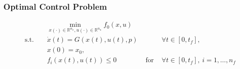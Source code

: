

\begin{frame}
\frametitle{Optimal Control Problem}
\begin{block}{}
\begin{align*}
 &&& \min_{x(\cdot)\in \mathbb{R}^{n_{x}}, u(\cdot)\in \mathbb{R}^{n_{u}}}  f_{0}(x, u)\\
& \text{ s.t. } && \dot{x}(t) = G(x(t), u(t), p) && \forall t \in [0, t_f],\\
&&& x(0) = x_0,\\
&&&  f_{i}(x(t),u(t)) \leq 0 & \text{ for } & \forall t \in [0, t_f], \ i=1,\ldots,n_{f}
\end{align*}
\end{block}
\end{frame}